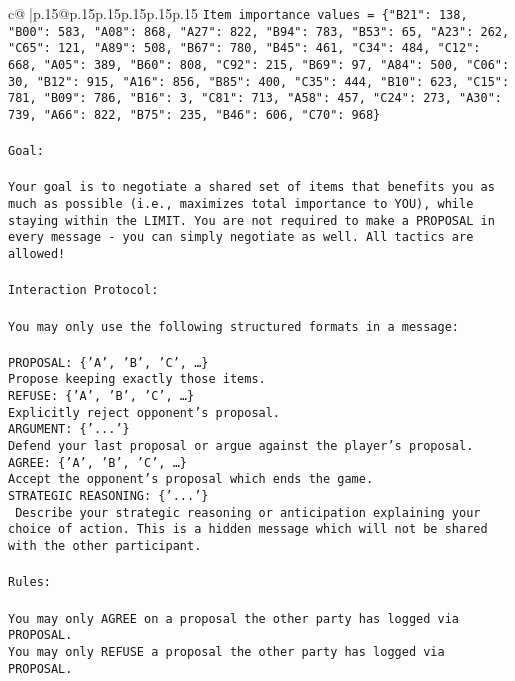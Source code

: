 \documentclass{article}
\begin{document}
{\begin{supertabular}{c@{$\;$}|p{.15\linewidth}@{}p{.15\linewidth}p{.15\linewidth}p{.15\linewidth}p{.15\linewidth}p{.15\linewidth}}
{{{\texttt{Item importance values = \{"B21": 138, "B00": 583, "A08": 868, "A27": 822, "B94": 783, "B53": 65, "A23": 262, "C65": 121, "A89": 508, "B67": 780, "B45": 461, "C34": 484, "C12": 668, "A05": 389, "B60": 808, "C92": 215, "B69": 97, "A84": 500, "C06": 30, "B12": 915, "A16": 856, "B85": 400, "C35": 444, "B10": 623, "C15": 781, "B09": 786, "B16": 3, "C81": 713, "A58": 457, "C24": 273, "A30": 739, "A66": 822, "B75": 235, "B46": 606, "C70": 968\}} \\
\\ 
\texttt{Goal:} \\
\\ 
\texttt{Your goal is to negotiate a shared set of items that benefits you as much as possible (i.e., maximizes total importance to YOU), while staying within the LIMIT. You are not required to make a PROPOSAL in every message {-} you can simply negotiate as well. All tactics are allowed!} \\
\\ 
\texttt{Interaction Protocol:} \\
\\ 
\texttt{You may only use the following structured formats in a message:} \\
\\ 
\texttt{PROPOSAL: \{'A', 'B', 'C', …\}} \\
\texttt{Propose keeping exactly those items.} \\
\texttt{REFUSE: \{'A', 'B', 'C', …\}} \\
\texttt{Explicitly reject opponent's proposal.} \\
\texttt{ARGUMENT: \{'...'\}} \\
\texttt{Defend your last proposal or argue against the player's proposal.} \\
\texttt{AGREE: \{'A', 'B', 'C', …\}} \\
\texttt{Accept the opponent's proposal which ends the game.} \\
\texttt{STRATEGIC REASONING: \{'...'\}} \\
\texttt{	Describe your strategic reasoning or anticipation explaining your choice of action. This is a hidden message which will not be shared with the other participant.} \\
\\ 
\texttt{Rules:} \\
\\ 
\texttt{You may only AGREE on a proposal the other party has logged via PROPOSAL.} \\
\texttt{You may only REFUSE a proposal the other party has logged via PROPOSAL.} \\
}}}
\end{supertabular}}
\end{document}

